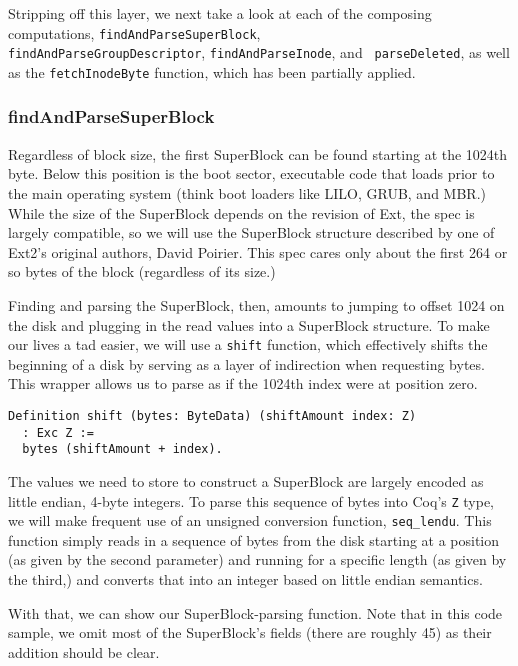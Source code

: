\documentclass[nocopyrightspace]{sigplanconf}
\begin{document}
Stripping off this layer, we next take a look at each of the composing
computations, {\tt findAndParseSuperBlock}, \\
{\tt findAndParseGroupDescriptor}, {\tt findAndParseInode}, and {\tt
parseDeleted}, as well as the {\tt fetchInodeByte} function, which has been
partially applied.

\subsubsection{findAndParseSuperBlock}

Regardless of block size, the first SuperBlock can be found starting at the
1024th byte. Below this position is the boot sector, executable code that
loads prior to the main operating system (think boot loaders like LILO, GRUB,
and MBR.) While the size of the SuperBlock depends on the revision of Ext, the
spec is largely compatible, so we will use the SuperBlock structure described
by one of Ext2's original authors, David Poirier\cite{non-gnu}. This spec
cares only about the first 264 or so bytes of the block (regardless of its
size.)

Finding and parsing the SuperBlock, then, amounts to jumping to offset 1024 on
the disk and plugging in the read values into a SuperBlock structure. To make
our lives a tad easier, we will use a {\tt shift} function, which effectively
shifts the beginning of a disk by serving as a layer of indirection when
requesting bytes. This wrapper allows us to parse as if the 1024th index were
at position zero.

\begin{lstlisting}
Definition shift (bytes: ByteData) (shiftAmount index: Z)
  : Exc Z :=
  bytes (shiftAmount + index).
\end{lstlisting}

The values we need to store to construct a SuperBlock are largely encoded as
little endian, 4-byte integers. To parse this sequence of bytes into Coq's
{\tt Z} type, we will make frequent use of an unsigned conversion function,
{\tt seq\_lendu}. This function simply reads in a sequence of bytes from the
disk starting at a position (as given by the second parameter) and running for
a specific length (as given by the third,) and converts that into an integer
based on little endian semantics. 

With that, we can show our SuperBlock-parsing function. Note that in this code
sample, we omit most of the SuperBlock's fields (there are roughly 45) as
their addition should be clear.
\end{document}
